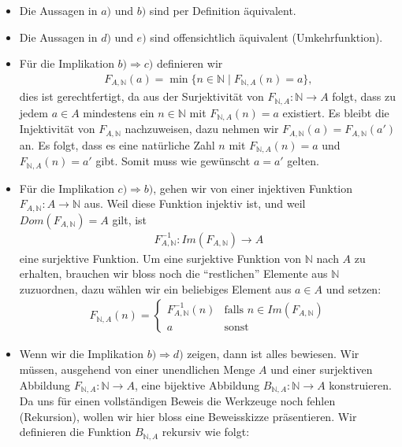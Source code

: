 \begin{itemize}
	\item Die Aussagen in $a)$ und $b)$ sind per Definition äquivalent.
	\item Die Aussagen in $d)$ und $e)$ sind offensichtlich äquivalent (Umkehrfunktion).
	\item Für die Implikation $b)\Rightarrow c)$ definieren wir
	      \begin{align*}
		      F_{A,\mathbb{N}}(a)=\min\{n\in\mathbb{N} \mid F_{\mathbb{N},A}(n)=a\},
	      \end{align*}
	      dies ist gerechtfertigt, da aus der Surjektivität von $F_{\mathbb{N},A}:\mathbb{N}\to A$ folgt, dass zu jedem $a\in A$ mindestens ein $n\in\mathbb{N}$ mit $F_{\mathbb{N},A}(n)=a$ existiert. Es bleibt die Injektivität von $F_{A,\mathbb{N}}$ nachzuweisen, dazu nehmen wir $F_{A,\mathbb{N}}(a)=F_{A,\mathbb{N}}(a')$ an. Es folgt, dass es eine natürliche Zahl $n$ mit $F_{\mathbb{N},A}(n)=a$ und $F_{\mathbb{N},A}(n)=a'$ gibt. Somit muss wie gewünscht $a=a'$ gelten.
	\item Für die Implikation $c)\Rightarrow b)$, gehen wir von einer injektiven Funktion $F_{A,\mathbb{N}}:A\to\mathbb{N}$ aus.
	      Weil diese Funktion injektiv ist, und weil $Dom(F_{A,\mathbb{N}})=A$ gilt, ist
	      \begin{align*}
		      F_{A,\mathbb{N}}^{-1}:Im(F_{A,\mathbb{N}}) \to A
	      \end{align*}
	      eine surjektive Funktion. Um eine surjektive Funktion von $\mathbb{N}$ nach $A$ zu erhalten, brauchen wir bloss noch die ``restlichen'' Elemente aus $\mathbb{N}$ zuzuordnen, dazu wählen wir ein beliebiges Element aus $a\in A$ und setzen:
	      \begin{align*}
		      F_{\mathbb{N},A}(n)=
		      \begin{cases}
			      F_{A,\mathbb{N}}^{-1}(n) & \text{falls }n\in Im(F_{A,\mathbb{N}}) \\
			      a                        & \text{sonst}
		      \end{cases}
	      \end{align*}
	\item Wenn wir die Implikation $b)\Rightarrow d)$ zeigen, dann ist alles bewiesen. Wir müssen, ausgehend von einer unendlichen Menge $A$ und einer surjektiven Abbildung $F_{\mathbb{N},A}: \mathbb{N}\to A$, eine bijektive Abbildung $B_{\mathbb{N},A}: \mathbb{N}\to A$ konstruieren. Da uns für einen vollständigen Beweis die Werkzeuge noch fehlen (Rekursion), wollen wir hier bloss eine Beweisskizze präsentieren. Wir definieren die Funktion $B_{\mathbb{N},A}$ rekursiv wie folgt:

\end{itemize}
